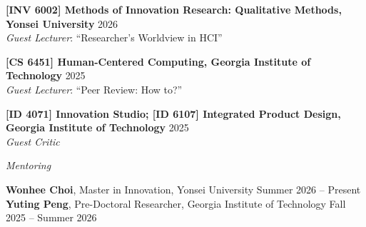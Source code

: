 \vspace{-0.25cm}

\noindent\textbf{[INV 6002] Methods of Innovation Research: Qualitative Methods, Yonsei University} \hfill{2026}\\
\textit{Guest Lecturer}: ``Researcher's Worldview in HCI'' \\

\vspace{-0.25cm}

\noindent\textbf{[CS 6451] Human-Centered Computing, Georgia Institute of Technology} \hfill{2025}\\
\textit{Guest Lecturer}: ``Peer Review: How to?'' \\

\vspace{-0.25cm}

\noindent\textbf{[ID 4071] Innovation Studio; [ID 6107] Integrated Product Design, Georgia Institute of Technology} \hfill{2025}\\
\textit{Guest Critic} \\

\vspace{-0.1cm}

\noindent \textit{Mentoring}\\

\vspace{-0.25cm}

\noindent \textbf{Wonhee Choi}, Master in Innovation, Yonsei University \hfill{Summer 2026 -- Present} \\
\noindent \textbf{Yuting Peng}, Pre-Doctoral Researcher, Georgia Institute of Technology \hfill{Fall 2025 -- Summer 2026}
